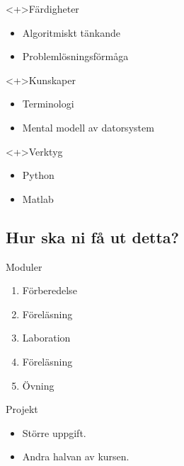 \begin{frame}
  \begin{block}<+>{Färdigheter}
    \begin{itemize}
      \item Algoritmiskt tänkande
      \item Problemlösningsförmåga
    \end{itemize}
  \end{block}

  \begin{block}<+>{Kunskaper}
    \begin{itemize}
      \item Terminologi
      \item Mental modell av datorsystem
    \end{itemize}
  \end{block}

  \begin{block}<+>{Verktyg}
    \begin{itemize}
      \item Python
      \item Matlab
    \end{itemize}
  \end{block}
\end{frame}

\subsection{Hur ska ni få ut detta?}

\begin{frame}
  \begin{block}{Moduler}
    \begin{enumerate}
      \item Förberedelse
      \item Föreläsning
      \item Laboration
      \item Föreläsning
      \item Övning
    \end{enumerate}
  \end{block}

  \pause

  \begin{block}{Projekt}
    \begin{itemize}
      \item Större uppgift.
      \item Andra halvan av kursen.
    \end{itemize}
  \end{block}
\end{frame}

